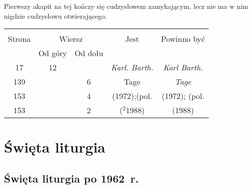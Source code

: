 \documentclass[a4paper,11pt]{article}
\begin{document}
\start {} Pierwszy akapit na tej kończy się cudzysłowem
zamykającym, lecz nie ma w nim nigdzie cudzysłowu otwierającego.

\vspace{\spaceFour}



\begin{center}
  \begin{tabular}{|c|c|c|c|c|}
    \hline
    & \multicolumn{2}{c|}{} & & \\
    Strona & \multicolumn{2}{c|}{Wiersz} & Jest
                              & Powinno być \\ \cline{2-3}
    & Od góry & Od dołu & & \\
    \hline
    17  & 12 & & \emph{Karl. Barth.} & \emph{Karl Barth.} \\
    139 & &  6 & Tage & \emph{Tage} \\
    153 & &  4 & (1972);(pol. & (1972); (pol. \\
    153 & &  2 & ($^{ 2 }$1988) & (1988) \\
    \hline
  \end{tabular}
\end{center}












\newpage
\section{Święta liturgia}

\vspace{\spaceTwo}



\subsection{Święta liturgia po 1962~r.}

\vspace{\spaceThree}
\end{document}
